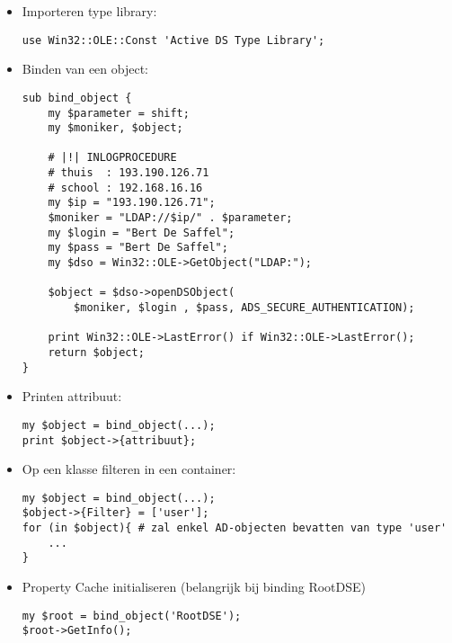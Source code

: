 \documentclass{report}
\begin{document}


\begin{itemize}
    \item[\info] Importeren type library:
    \begin{lstlisting}
use Win32::OLE::Const 'Active DS Type Library';
    \end{lstlisting}
    \item[\info] Binden van een object:
    \begin{lstlisting}
sub bind_object {
    my $parameter = shift;
    my $moniker, $object;

    # |!| INLOGPROCEDURE    
    # thuis  : 193.190.126.71
    # school : 192.168.16.16
    my $ip = "193.190.126.71";
    $moniker = "LDAP://$ip/" . $parameter; 
    my $login = "Bert De Saffel";
    my $pass = "Bert De Saffel";
    my $dso = Win32::OLE->GetObject("LDAP:");

    $object = $dso->openDSObject(
        $moniker, $login , $pass, ADS_SECURE_AUTHENTICATION);

    print Win32::OLE->LastError() if Win32::OLE->LastError();
    return $object;
}

    \end{lstlisting}

    \item[\info] Printen attribuut:
    \begin{lstlisting}
my $object = bind_object(...);
print $object->{attribuut};
    \end{lstlisting}

    \item[\info] Op een klasse filteren in een container:
    \begin{lstlisting}
my $object = bind_object(...);
$object->{Filter} = ['user'];
for (in $object){ # zal enkel AD-objecten bevatten van type 'user'
    ...
}
    \end{lstlisting}

    \item[\info] Property Cache initialiseren (belangrijk bij binding RootDSE)
    \begin{lstlisting}
my $root = bind_object('RootDSE');
$root->GetInfo();


\end{lstlisting}
\end{itemize}
\end{document}
